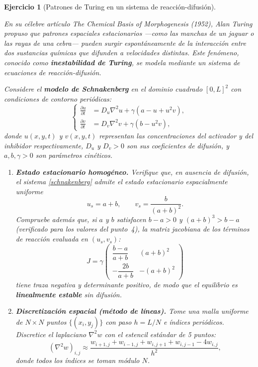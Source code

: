 \documentclass[12pt]{article}
\newtheorem{exercise}{Ejercicio}
\begin{document}
\begin{exercise}[Patrones de Turing en un sistema de reacción-difusión]\label{ejer_turing}

En su célebre artículo \textit{The Chemical Basis of Morphogenesis} (1952), Alan Turing propuso que patrones espaciales estacionarios ---como las manchas de un jaguar o las rayas de una cebra--- pueden surgir espontáneamente de la interacción entre dos sustancias químicas que difunden a velocidades distintas. Este fenómeno, conocido como \textbf{inestabilidad de Turing}, se modela mediante un sistema de ecuaciones de reacción-difusión.

Considere el \textbf{modelo de Schnakenberg} en el dominio cuadrado $[0, L]^2$ con condiciones de contorno periódicas:
\begin{equation}\label{schnakenberg}
\left\lbrace
\begin{aligned}
\frac{\partial u}{\partial t} &= D_u \nabla^2 u + \gamma\!\left(a - u + u^2 v\right), \\[4pt]
\frac{\partial v}{\partial t} &= D_v \nabla^2 v + \gamma\!\left(b - u^2 v\right),
\end{aligned}
\right.
\end{equation}
donde $u(x,y,t)$ y $v(x,y,t)$ representan las concentraciones del \textit{activador} y del \textit{inhibidor} respectivamente, $D_u$ y $D_v > 0$ son sus coeficientes de difusión, y $a, b, \gamma > 0$ son parámetros cinéticos.

\begin{enumerate}
\item \textbf{Estado estacionario homogéneo.} Verifique que, en ausencia de difusión, el sistema \eqref{schnakenberg} admite el estado estacionario espacialmente uniforme
\[
u_s = a + b, \qquad v_s = \frac{b}{(a+b)^2}.
\]
Compruebe además que, si $a$ y $b$ satisfacen $b - a > 0$ y $(a+b)^3 > b - a$ (verificado para los valores del punto~4), la matriz jacobiana de los términos de reacción evaluada en $(u_s, v_s)$:
\[
J = \gamma \begin{pmatrix} \dfrac{b-a}{a+b} & (a+b)^2 \\[8pt] -\dfrac{2b}{a+b} & -(a+b)^2 \end{pmatrix}
\]
tiene traza negativa y determinante positivo, de modo que el equilibrio es \textbf{linealmente estable} sin difusión.

\item \textbf{Discretización espacial (método de líneas).} Tome una malla uniforme de $N \times N$ puntos $\{(x_i, y_j)\}$ con paso $h = L/N$ e índices periódicos. Discretice el laplaciano $\nabla^2 w$ con el estencil estándar de 5 puntos:
\[
(\nabla^2 w)_{i,j} \approx \frac{w_{i+1,j} + w_{i-1,j} + w_{i,j+1} + w_{i,j-1} - 4w_{i,j}}{h^2},
\]
donde todos los índices se toman módulo $N$.


\end{enumerate}
\end{exercise}
\end{document}
